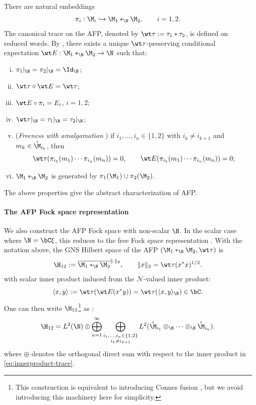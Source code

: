\documentclass[sn-mathphys-num]{sn-jnl}
\begin{document}
There are natural embeddings
\begin{equation}\label{eq:pi_i}
\pi_i:\M_i\hookrightarrow \M_1*_{\N}\M_2,\qquad i=1,2.
\end{equation}
The canonical trace on the AFP, denoted by $\wt\tau:=\tau_1*\tau_2$, is defined on reduced words.
By \cite[Theorem~4.2]{takesaki_theory_2003-2}, there exists a unique $\wt\tau$-preserving conditional
expectation $\wt E:\M_1*_{\N}\M_2\to\N$ such that:
\begin{enumerate}[(i)]
  \item $\pi_1|_{\N}=\pi_2|_{\N}=\Id_{\N}$;
  \item $\wt\tau\circ\wt E=\wt\tau$;
  \item $\wt E\circ\pi_i=E_i$, $i=1,2$;
  \item $\wt\tau|_{\N}=\tau_1|_{\N}=\tau_2|_{\N}$;
  \item (\emph{Freeness with amalgamation} \cite{voiculescu_free_1992})
  if $i_1,\dots,i_n\in\{1,2\}$ with $i_k\neq i_{k+1}$ and $m_k\in\mathring{\M}_{i_k}$, then
  \[
  \wt\tau(\pi_{i_1}(m_1)\cdots\pi_{i_n}(m_n))=0,
  \qquad
  \wt E(\pi_{i_1}(m_1)\cdots\pi_{i_n}(m_n))=0;
  \]
  \item $\M_1*_{\N}\M_2$ is generated by $\pi_1(\M_1)\cup\pi_2(\M_2)$.
\end{enumerate}
The above properties give the abstract characterization of AFP.
\paragraph{The AFP Fock space representation}
We also construct the AFP Fock space with non-scalar $\N$.
In the scalar case where $\N=\bC\xi$, this reduces to the free Fock space representation .
With the notation above, the GNS Hilbert space of the AFP $(\M_1*_{\N}\M_2,\wt\tau)$ is
\[
\H_{12}:=\overline{\M_1*_{\N}\M_2}^{\|\cdot\|_2},
\qquad
\|x\|_2=\wt\tau(x^*x)^{1/2}.
\]
with scalar inner product induced from the $\mathcal{N}$-valued inner product:
\begin{equation}\label{eq:innerproduct-trace}
\langle x,y\rangle := \wt\tau(\wt E(x^*y))
= \wt\tau(\langle x,y\rangle_\N) \in \bC .
\end{equation}
One can then write $\H_{12}$\footnote{This construction is equivalent to introducing Connes fusion \cite{takesaki_theory_2003-2}, but we avoid introducing this machinery here for simplicity.} as \cite{brown_-algebras_2008}:
\begin{equation}\label{eq:hilbert-free}
\H_{12}
= L^{2}(\N)
\oplus
\bigoplus_{n=1}^\infty
\bigoplus_{\substack{i_{1},\dots,i_{n}\in\{1,2\}\\ i_{k}\neq i_{k+1}}}
L^{2}     (\mathring{\M}_{i_{1}}\otimes_{\N}\cdots\otimes_{\N}\mathring{\M}_{i_{n}}   ).
\end{equation}
where $\oplus$ denotes the orthogonal direct sum with respect to the inner product in \eqref{eq:innerproduct-trace}.
\end{document}
